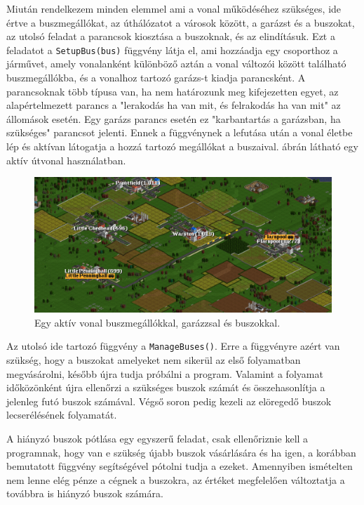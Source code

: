 Miután rendelkezem minden elemmel ami a vonal működéséhez szükséges, ide értve a buszmegállókat, az úthálózatot a városok között, a garázst és a buszokat, az utolsó feladat a parancsok kiosztása a buszoknak, és az elindításuk. Ezt a feladatot a \texttt{SetupBus(bus)} függvény látja el, ami hozzáadja egy csoporthoz a járművet, amely vonalanként különböző aztán a vonal változói között található buszmegállókba, és a vonalhoz tartozó garázs-t kiadja parancsként. A parancsoknak több típusa van, ha nem határozunk meg kifejezetten egyet, az alapértelmezett parancs a "lerakodás ha van mit, és felrakodás ha van mit" az állomások esetén. Egy garázs parancs esetén ez "karbantartás a garázsban, ha szükséges" parancsot jelenti. Ennek a függvénynek a lefutása után a vonal életbe lép és aktívan látogatja a hozzá tartozó megállókat a buszaival.  ábrán látható egy aktív útvonal használatban.

\begin{figure}
	\centering
	\includegraphics[width=\textwidth]{images/vonal.png}
	\caption{Egy aktív vonal buszmegállókkal, garázzsal és buszokkal.}
	\label{fig:vonal}
\end{figure}

Az utolsó ide tartozó függvény a \texttt{ManageBuses()}. Erre a függvényre azért van szükség, hogy a buszokat amelyeket nem sikerül az első folyamatban megvásárolni, később újra tudja próbálni a program. Valamint a folyamat időközönként újra ellenőrzi a szükséges buszok számát és összehasonlítja a jelenleg futó buszok számával. Végső soron pedig kezeli az elöregedő buszok lecserélésének folyamatát.

A hiányzó buszok pótlása egy egyszerű feladat, csak ellenőriznie kell a programnak, hogy van e szükség újabb buszok vásárlására és ha igen, a korábban bemutatott függvény segítségével pótolni tudja a ezeket. Amennyiben ismételten nem lenne elég pénze a cégnek a buszokra, az értéket megfelelően változtatja a továbbra is hiányzó buszok számára.

